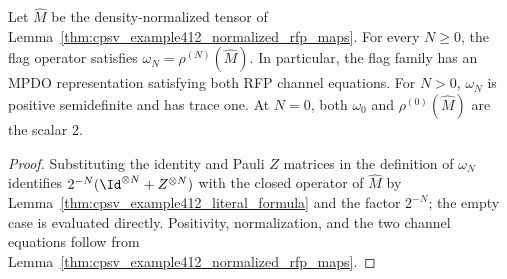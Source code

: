 \begin{lemma}%
    \label{thm:mpdo_twisted_dimer_flag_factor}
    \leanok
    Let $\widehat M$ be the density-normalized tensor of
    Lemma~\ref{thm:cpsv_example412_normalized_rfp_maps}. For every
    $N\geq0$, the flag operator satisfies
    $\omega_N=\rho^{(N)}(\widehat M)$.
    In particular, the flag family has an MPDO representation satisfying
    both RFP channel equations. For $N>0$, $\omega_N$ is positive
    semidefinite and has trace one. At $N=0$, both
    $\omega_0$ and $\rho^{(0)}(\widehat M)$ are the scalar $2$.
\end{lemma}
\begin{proof}\leanok
    Substituting the identity and Pauli $Z$ matrices in the definition of
    $\omega_N$ identifies $2^{-N}(\Id^{\otimes N}+Z^{\otimes N})$
    with the closed operator of $\widehat M$ by
    Lemma~\ref{thm:cpsv_example412_literal_formula} and the factor
    $2^{-N}$; the empty case is evaluated directly. Positivity,
    normalization, and the two channel equations
    follow from Lemma~\ref{thm:cpsv_example412_normalized_rfp_maps}.
\end{proof}

